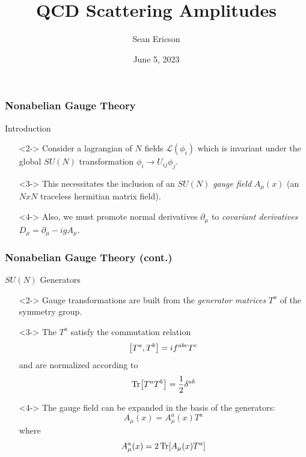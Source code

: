 \documentclass{beamer}
\title{QCD Scattering Amplitudes}
\author{Sean Ericson}
\institute{UO}
\date{June 5, 2023}
\begin{document}
\frame{\titlepage}

\begin{frame}
    \frametitle{Nonabelian Gauge Theory}
    \alert{Introduction}
    \begin{itemize}
        \item[\textbullet]<2-> Consider a lagrangian of $N$ fields $\mathcal{L}(\phi_i)$ which is invariant under the global $SU(N)$ transformation $\phi_i \to U_{ij}\phi_j$.
        \item[\textbullet]<3-> This necessitates the inclusion of an $SU(N)$ \textit{gauge field} $A_\mu(x)$ (an $NxN$ traceless hermitian matrix field).
        \item[\textbullet]<4-> Also, we must promote normal derivatives $\partial_\mu$ to \textit{covariant derivatives} $D_\mu = \partial_\mu - igA_\mu$. 
    \end{itemize}
\end{frame}

\begin{frame}
    \frametitle{Nonabelian Gauge Theory (cont.)}
    \alert{$SU(N)$ Generators}
    \begin{itemize}
        \item[\textbullet]<2-> Gauge transformations are built from the \textit{generator matrices} $T^a$ of the symmetry group.
        \item[\textbullet]<3-> The $T^a$ satisfy the commutation relation \[ \comm{T^a}{T^b} = if^{abc}T^c \] and are normalized according to \[ \Tr[T^aT^b] = \frac{1}{2}\delta^{ab} \]
        \item[\textbullet]<4-> The gauge field can be expanded in the basis of the generators: \[ A_\mu(x) = A_\mu^a(x)T^a \] where \[ A_\mu^a(x) = 2\Tr[A_\mu(x)T^a] \]
    \end{itemize}
\end{frame}
\end{document}
